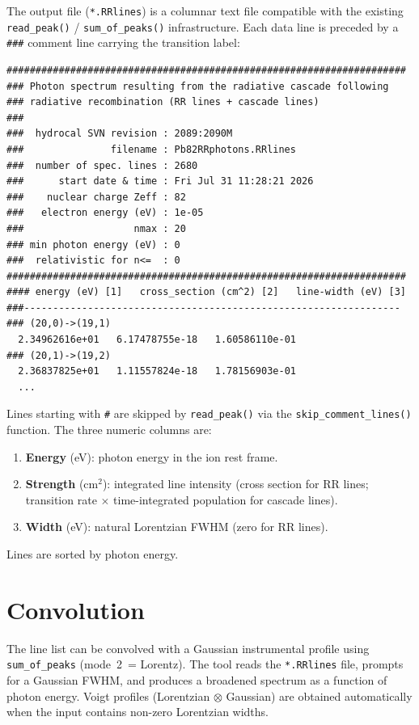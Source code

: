 \documentclass[11pt,a4paper]{article}
\begin{document}
The output file (\texttt{*.RRlines}) is a columnar text file compatible
with the existing \texttt{read\_peak()} / \texttt{sum\_of\_peaks()}
infrastructure.  Each data line is preceded by a \texttt{\#\#\#} comment
line carrying the transition label:
\begin{verbatim}
#####################################################################
### Photon spectrum resulting from the radiative cascade following
### radiative recombination (RR lines + cascade lines)
###
###  hydrocal SVN revision : 2089:2090M
###               filename : Pb82RRphotons.RRlines
###  number of spec. lines : 2680
###      start date & time : Fri Jul 31 11:28:21 2026
###    nuclear charge Zeff : 82
###   electron energy (eV) : 1e-05
###                   nmax : 20
### min photon energy (eV) : 0
###  relativistic for n<=  : 0
#####################################################################
#### energy (eV) [1]   cross_section (cm^2) [2]   line-width (eV) [3]
###-----------------------------------------------------------------
### (20,0)->(19,1)
  2.34962616e+01   6.17478755e-18   1.60586110e-01
### (20,1)->(19,2)
  2.36837825e+01   1.11557824e-18   1.78156903e-01
  ...
\end{verbatim}
Lines starting with \texttt{\#} are skipped by \texttt{read\_peak()}
via the \texttt{skip\_comment\_lines()} function.  The three numeric
columns are:
\begin{enumerate}
\item \textbf{Energy} (eV): photon energy in the ion rest frame.
\item \textbf{Strength} (cm$^2$): integrated line intensity
  (cross section for RR lines; transition rate $\times$ time-integrated
  population for cascade lines).
\item \textbf{Width} (eV): natural Lorentzian FWHM (zero for RR lines).
\end{enumerate}
Lines are sorted by photon energy.

\section{Convolution}

The line list can be convolved with a Gaussian instrumental profile using
\texttt{sum\_of\_peaks} (mode~2~= Lorentz).  The tool reads the
\texttt{*.RRlines} file, prompts for a Gaussian FWHM, and produces a
broadened spectrum as a function of photon energy.  Voigt profiles
(Lorentzian $\otimes$ Gaussian) are obtained automatically when the
input contains non-zero Lorentzian widths.
\end{document}
